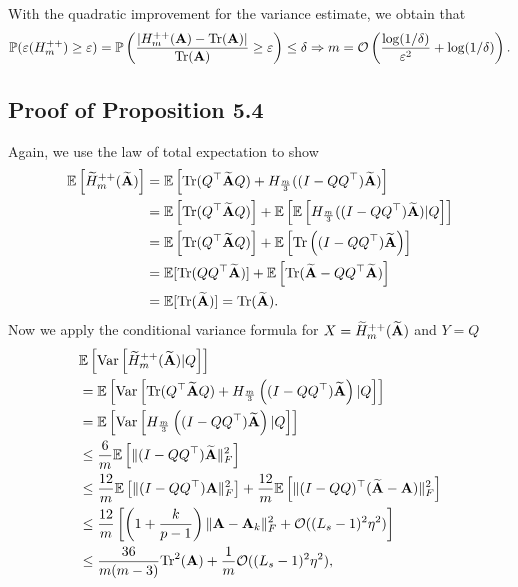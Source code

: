 With the quadratic improvement for the variance estimate, we obtain that 
  \begin{equation}
	\begin{aligned}
		\mathbb P(\varepsilon(H_m^{++})\ge \varepsilon)= \mathbb P\left( \frac{|H^{++}_m({\bf A})-\mathrm{Tr}({\bf A})|}{\mathrm{Tr}({\bf A})}\ge \varepsilon \right)\le \delta\Rightarrow m=\mathcal{O}\left(\frac{\log(1/\delta)}{\varepsilon^2}+\log(1/\delta)  \right).
	\end{aligned}
	\label{}
\end{equation}

\subsection{Proof of Proposition 5.4}
Again, we use the law of total expectation to show
\begin{align*}
    \mathbb{E}\left[ \widetilde{H}_m^{++}(\widetilde{{\bf A}}) \right]&=\mathbb{E}\left[ \mathrm{Tr}(Q^\top \widetilde{{\bf A}} Q)+H_{\frac{m}{3}}( (I-QQ^\top)\widetilde{{\bf A}}) \right]\\
    &=\mathbb{E}\left[ \mathrm{Tr}(Q^\top \widetilde{{\bf A}} Q) \right]+\mathbb{E}\left[ \mathbb{E}\left[ H_{\frac{m}{3}}( (I-QQ^\top)\widetilde{{\bf A}})|Q \right] \right]\\
    &=\mathbb{E}\left[ \mathrm{Tr}(Q^\top \widetilde{{\bf A}} Q) \right]+\mathbb{E}\left[ \mathrm{Tr}\left( (I-QQ^\top)\widetilde{{\bf A}} \right) \right]\\
    &=\mathbb{E}[\mathrm{Tr}(QQ^\top\widetilde{{\bf A}})]+\mathbb{E}\left[ \mathrm{Tr}(\widetilde{{\bf A}}-QQ^\top\widetilde{{\bf A}}) \right]\\
    &=\mathbb{E}[\mathrm{Tr}(\widetilde{{\bf A}})]=\mathrm{Tr}(\widetilde{{\bf A}}). 
  \end{align*}
Now we apply the conditional variance formula for $X = \widetilde{H}_m^{++}(\widetilde{{\bf A}})$ and $Y = Q$
\begin{align*}
	&\mathbb{E}\left[ \mathrm{Var}\left[ \widetilde{H}_m^{++}(\widetilde{{\bf A}})|Q \right] \right]\\
	&=\mathbb{E}\left[ \mathrm{Var}\left[ \mathrm{Tr}(Q^\top \widetilde{{\bf A}} Q)+H_{\frac{m}{3}}\left( (I-QQ^\top)\widetilde{{\bf A}} \right)|Q \right] \right]\\
	&=\mathbb{E}\left[ \mathrm{Var}\left[ H_{\frac{m}{3}}\left( (I-QQ^\top)\widetilde{{\bf A}}\right)|Q \right]\right]\\
	&\le \frac{6}{m}\mathbb{E}\left[ \|(I-QQ^\top)\widetilde{{\bf A}}\|_{F}^2 \right]\\
    &\le \frac{12}{m}\mathbb{E}\left[ \|(I-QQ^\top){\bf A}\|_{F}^2 \right]+\frac{12}{m}  \mathbb{E}\left[\|(I-QQ)^\top(\widetilde{{\bf A}}-{\bf A}) \|^2_F \right]              \\
	&\le \frac{12}{m}\left[\left( 1+\frac{k}{p-1} \right)\|{\bf A}-{\bf A}_{k}\|_{F}^2+\mathcal{O}((L_s-1)^2\eta^2)\right]\\
	&\le\frac{36}{m(m-3)}\mathrm{Tr}^2({\bf A})+\frac{1}{m}\mathcal{O}((L_s-1)^2\eta^2),
\end{align*}
